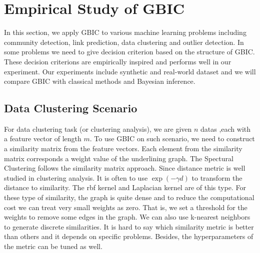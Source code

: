 \section{Empirical Study of GBIC}\label{sec:es}
In this section, we apply GBIC to various machine learning problems including community detection, link prediction, data clustering and outlier detection. In some problems we need to give decision criterion  based on the structure of GBIC. These decision criterions are empirically inspired and performs well in our experiment.  Our experiments
include synthetic and real-world dataset and we will compare GBIC with classical methods and Bayesian inference.
\subsection{Data Clustering Scenario}\label{subsec:dc}
For data clustering task (or clustering analysis), we are given $n$ datas ,each with a feature vector of length $m$. To use GBIC on such scenario, we need to construct a similarity matrix from the feature vectors. Each element from the similarity matrix corresponds a weight value of the underlining graph. The Spectural Clustering follows the similarity matrix approach. Since distance metric is well studied in clustering analysis. It is often to use $\exp(-\gamma d)$ to transform the distance to similarity. The rbf kernel and Laplacian kernel are of this type. For these type of similarity, the graph is quite dense and to reduce the computational cost we can treat very small weights as zero. That is, we set a threshold for the weights to remove some edges in the graph. We can also use k-nearest neighbors to generate discrete similarities. It is hard to say which similarity metric is better than others and it depends on specific problems. Besides, the hyperparameters of the metric can be tuned as well.


